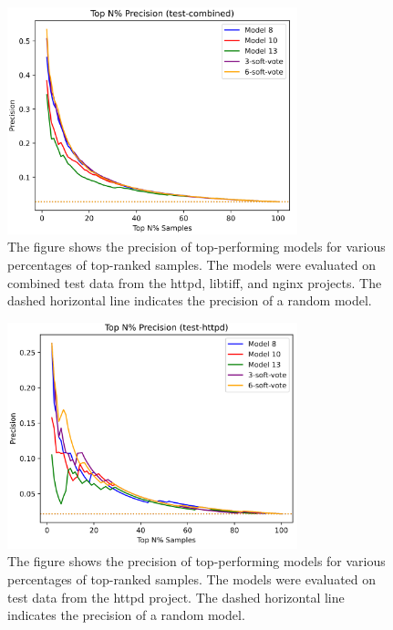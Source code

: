 \begin{figure}[ht]
	\centering
	\includegraphics[width=0.75\textwidth]{figures/topn-combined.png}
	\caption{The figure shows the precision of top-performing models for various percentages of top-ranked samples. The models were evaluated on combined test data from the httpd, libtiff, and nginx projects. The dashed horizontal line indicates the precision of a random model.}
	\label{figure:topn-combined}
\end{figure}

\begin{figure}[ht]
	\centering
	\includegraphics[width=0.75\textwidth]{figures/topn-httpd.png}
	\caption{The figure shows the precision of top-performing models for various percentages of top-ranked samples. The models were evaluated on test data from the httpd project. The dashed horizontal line indicates the precision of a random model.}
	\label{figure:topn-httpd}
\end{figure}

